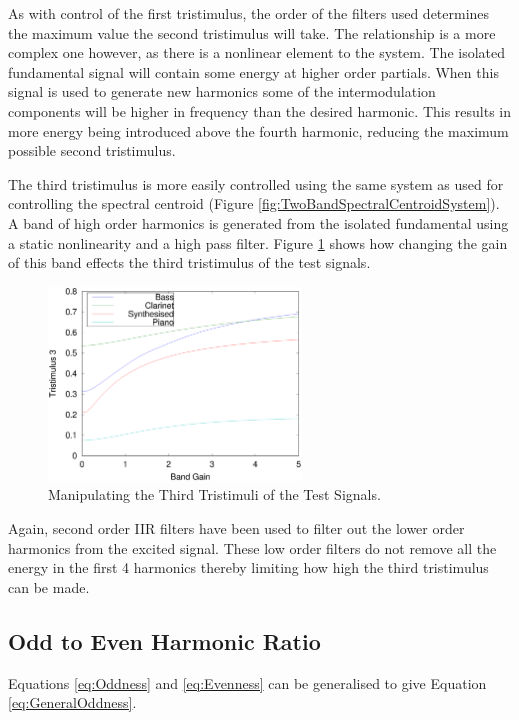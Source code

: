 			As with control of the first tristimulus, the order of the filters used determines the maximum
			value the second tristimulus will take. The relationship is a more complex one however, as there is
			a nonlinear element to the system. The isolated fundamental signal will contain some energy at
			higher order partials.  When this signal is used to generate new harmonics some of the
			intermodulation components will be higher in frequency than the desired harmonic. This results in
			more energy being introduced above the fourth harmonic, reducing the maximum possible second
			tristimulus.

			The third tristimulus is more easily controlled using the same system as used for controlling the
			spectral centroid (Figure \ref{fig:TwoBandSpectralCentroidSystem}). A band of high order harmonics
			is generated from the isolated fundamental using a static nonlinearity and a high pass filter.
			Figure \ref{fig:MoveTristimulus3} shows how changing the gain of this band effects the third
			tristimulus of the test signals.

			\begin{figure}[h!]
				\centering
				\includegraphics[width=0.6\textwidth]{chapter6/Images/MoveTristimulus3.eps}
				\caption{Manipulating the Third Tristimuli of the Test Signals.}
				\label{fig:MoveTristimulus3}
			\end{figure}

			Again, second order IIR filters have been used to filter out the lower order harmonics from the
			excited signal.	These low order filters do not remove all the energy in the first 4 harmonics
			thereby limiting how high the third tristimulus can be made.

	\subsection{Odd to Even Harmonic Ratio}
	\label{sec:FeatureControl-Parameterisation-HarmonicParityRatio}
		Equations \ref{eq:Oddness} and \ref{eq:Evenness} can be generalised to give Equation
		\ref{eq:GeneralOddness}.

